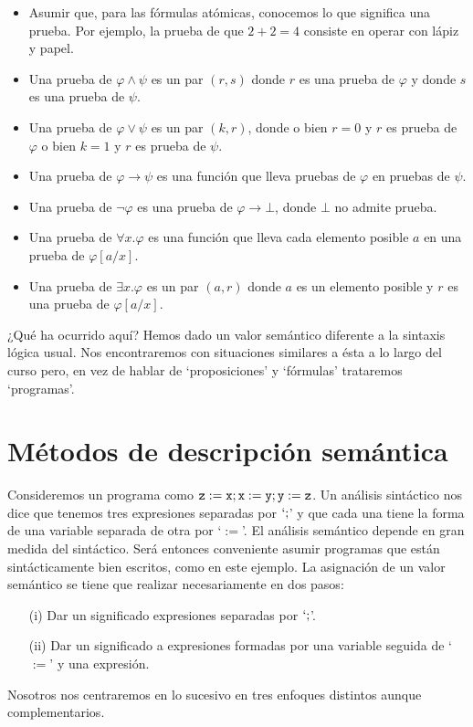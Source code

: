 \begin{itemize}
    \item Asumir que, para las fórmulas atómicas, conocemos lo que significa una prueba. Por ejemplo, la prueba de que $2 + 2 = 4$ consiste en operar con lápiz y papel.
    \item Una prueba de $\varphi \land \psi$ es un par $(r, s)$ donde $r$ es una prueba de $\varphi$ y donde $s$ es una prueba de $\psi$.
    \item Una prueba de $\varphi \lor \psi$ es un par $(k, r)$, donde o bien $r=0$ y $r$ es prueba de $\varphi$ o bien $k=1$ y $r$ es prueba de $\psi$.
    \item Una prueba de $\varphi \rightarrow \psi$ es una función que lleva pruebas de $\varphi$ en pruebas de $\psi$.
    \item Una prueba de $\neg \varphi$ es una prueba de $\varphi \rightarrow \bot$, donde $\bot$ no admite prueba.
    \item Una prueba de $\forall x. \varphi$ es una función que lleva cada elemento posible $a$ en una prueba de $\varphi[a/x]$.
    \item Una prueba de $\exists x.\varphi$ es un par $(a, r)$ donde $a$ es un elemento posible y $r$ es una prueba de $\varphi[a/x]$.
\end{itemize}
¿Qué ha ocurrido aquí? Hemos dado un valor semántico diferente a la sintaxis lógica usual. Nos encontraremos con situaciones similares a ésta a lo largo del curso pero, en vez de hablar de `proposiciones' y `fórmulas' trataremos `programas'.

\section{Métodos de descripción semántica}

Consideremos un programa como $\texttt{z}:= \texttt{x}; \texttt{x} := \texttt{y}; \texttt{y} := \texttt{z}$. Un análisis sintáctico nos dice que tenemos tres expresiones separadas por $`;$' y que cada una tiene la forma de una variable separada de otra por `$:=$'. El análisis semántico depende en gran medida del sintáctico. Será entonces conveniente asumir programas que están sintácticamente bien escritos, como en este ejemplo. La asignación de un valor semántico se tiene que realizar necesariamente en dos pasos: 
\begin{itemize}
    \item[(i)] Dar un significado expresiones separadas por $`;$'.
    \item[(ii)]  Dar un significado a expresiones formadas por una variable seguida de `$:=$' y una expresión.
\end{itemize}
Nosotros nos centraremos en lo sucesivo en tres enfoques distintos aunque complementarios.

